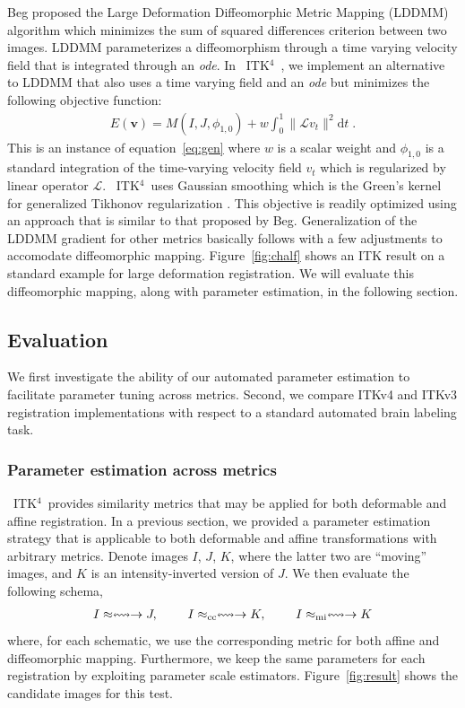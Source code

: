 \documentclass{frontiersSCNS}
\newcommand{\vect}[1]{\mathbf{#1}}
\renewcommand{\v}{\vect{v}}
\newcommand{\myphi}{\phi}
\newcommand{\dd}{\text{d}}
\newcommand{\myE}{E}
\newcommand{\opL}{\mathcal{L}}
\newcommand{\tk}{~ITK$^{\text{4}}$~}
\begin{document}
Beg proposed the Large Deformation Diffeomorphic Metric Mapping
(LDDMM) algorithm \cite{Miller2005} which minimizes the sum of squared differences
criterion between two images.  LDDMM parameterizes a
diffeomorphism through a time varying velocity field that is
integrated through an {\em ode}.  In \tk, we implement an alternative
to LDDMM that also uses a time varying field and an {\em ode} but minimizes
the following objective function:
\begin{align}
\myE(\v) = M(I,J,\myphi_{1,0})
+  w \int_{0}^{1} \| \opL v_t\|^2 \dd t \;.
\label{eq:lddmm}
\end{align}
This is an instance of equation~\ref{eq:gen} where $w$ is a scalar
weight and $\myphi_{1,0}$ is a standard integration of the
time-varying velocity field $v_t$ which is regularized by linear
operator $\opL$.  \tk uses Gaussian smoothing which is the Green's
kernel for generalized Tikhonov regularization \cite{Nielsen1997}.
This objective is readily optimized using an approach that is similar
to that proposed by Beg.  Generalization of the LDDMM gradient 
for other metrics basically follows \cite{hermosillo} with a few
adjustments to accomodate diffeomorphic mapping.
Figure~\ref{fig:chalf} shows an ITK result on a standard example for large
deformation registration.  We will evaluate this diffeomorphic
mapping, along with parameter estimation, in the following section.



\subsection{Evaluation}
We first investigate the ability of our automated parameter estimation
to facilitate parameter tuning across metrics.  Second, we compare
ITKv4 and ITKv3 registration implementations with respect to a
standard automated brain labeling task.

\subsubsection{Parameter estimation across metrics}
\tk provides similarity metrics that may be applied for both
deformable and affine registration.  In a previous section, we
provided a parameter estimation strategy that is applicable to both
deformable and affine transformations with arbitrary metrics.  Denote
images $I$, $J$, $K$, where the latter two are ``moving'' images, and
$K$ is an intensity-inverted version of $J$.
We then evaluate the following schema,
\begin{eqnarray}
I \approx \leftrightsquigarrow  \rightarrow J,~~~~~~~
I \approx_\text{cc} \leftrightsquigarrow  \rightarrow  K,~~~~~~~  
I \approx_\text{mi} \leftrightsquigarrow  \rightarrow  K   \notag 
\end{eqnarray}
where, for each schematic, we use the corresponding metric for both
affine and diffeomorphic mapping.  Furthermore, we keep the same
parameters for each registration by exploiting parameter scale
estimators.  Figure~\ref{fig:result} shows the candidate images for
this test. 
\end{document}
